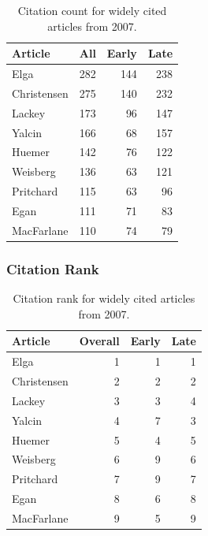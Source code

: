 \documentclass[
  10pt,
  letterpaper,
  DIV=11,
  numbers=noendperiod,
  twoside]{scrartcl}
\begin{document}
\begin{longtable}[]{@{}lrrr@{}}

\caption{\label{tbl-citation-count-2007}Citation count for widely cited
articles from 2007.}

\tabularnewline

\toprule\noalign{}
Article & All & Early & Late \\
\midrule\noalign{}
\endhead
\bottomrule\noalign{}
\endlastfoot
Elga & 282 & 144 & 238 \\
Christensen & 275 & 140 & 232 \\
Lackey & 173 & 96 & 147 \\
Yalcin & 166 & 68 & 157 \\
Huemer & 142 & 76 & 122 \\
Weisberg & 136 & 63 & 121 \\
Pritchard & 115 & 63 & 96 \\
Egan & 111 & 71 & 83 \\
MacFarlane & 110 & 74 & 79 \\

\end{longtable}

\subsubsection*{Citation Rank}\label{citation-rank-31}

\begin{longtable}[]{@{}lrrr@{}}

\caption{\label{tbl-citation-rank-2007}Citation rank for widely cited
articles from 2007.}

\tabularnewline

\toprule\noalign{}
Article & Overall & Early & Late \\
\midrule\noalign{}
\endhead
\bottomrule\noalign{}
\endlastfoot
Elga & 1 & 1 & 1 \\
Christensen & 2 & 2 & 2 \\
Lackey & 3 & 3 & 4 \\
Yalcin & 4 & 7 & 3 \\
Huemer & 5 & 4 & 5 \\
Weisberg & 6 & 9 & 6 \\
Pritchard & 7 & 9 & 7 \\
Egan & 8 & 6 & 8 \\
MacFarlane & 9 & 5 & 9 \\

\end{longtable}
\end{document}
